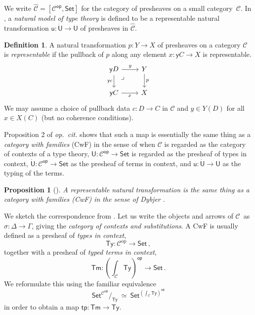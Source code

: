 \documentclass[12pt,reqno]{amsart}
\newcommand{\C}{\ensuremath{\mathbb{C}}}
\newcommand{\CC}{\ensuremath{\mathcal{C}}}
\newcommand{\op}[1]{\ensuremath{{#1}^{\mathsf{op}}}}
\newcommand{\pshx}[1]{\ensuremath{\mathsf{Set}^{\op{#1}}}}
\newcommand{\psh}[1]{\ensuremath{[\op{#1},\mathsf{Set}]}}
\newcommand{\Set}{\ensuremath{\mathsf{Set}}}
\newcommand{\y}{\ensuremath{\mathsf{y}}} %
\newcommand{\tp}{\ensuremath{\mathsf{tp}}}
\newcommand{\Tm}{\ensuremath{\mathsf{Tm}}}
\newcommand{\Ty}{\ensuremath{\mathsf{Ty}}}
\renewcommand{\to}{\ensuremath{\rightarrow}}
\renewcommand{\t}{\ensuremath{\mathsf{u}}}
\newcommand{\T}{\ensuremath{\mathsf{U}}}
\newcommand{\TT}{\ensuremath{\dot{\mathsf{U}}}}
\newcommand{\pbcorner}{\arrow[dr,phantom,"\lrcorner" very near start, shift right=.5ex]} %
\newtheorem{proposition}[theorem]{Proposition}
\theoremstyle{remark}
\theoremstyle{definition}
\newtheorem{definition}[theorem]{Definition}
\begin{document}
\noindent We write $\widehat{\CC} = \psh{\CC}$ for the category of presheaves on a small category~$\CC$. 
In \cite{awodey:NM}, a \emph{natural model of type theory} is defined to be a representable natural transformation $\t: \TT\to \T$ of presheaves in $\widehat{\CC}$.  

\begin{definition}\label{def:representablenattrans} A natural transformation $p : Y \to X$ of presheaves on a category $\CC$  is \emph{representable} if the pullback of $p$ along any element $x: \y{C} \to X$ is representable.
\begin{equation*}
\begin{tikzcd}
 \y{D} \ar[d,swap,"{\y{c}}"] \ar[r,"y"] \pbcorner &  Y \ar[d, "p"]\\
\y{C} \ar[r,swap,"x"]  & X
\end{tikzcd}
\end{equation*}
We may assume a choice of pullback data $c : D \to C$ in $\CC$ and $y \in Y(D)$ for all $x\in X(C)$ (but no coherence conditions).
\end{definition}

Proposition 2 of \emph{op.\ cit.} shows that such a map is essentially the same thing as a \emph{category with families} (CwF) in the sense of \cite{Dybjer:CWF} when $\CC$ is regarded as the category of contexts of a type theory, $\T: \op{\CC} \to \Set$ is regarded as the presheaf of types in context, $\TT: \op{\CC} \to \Set$ as the presheaf of terms in context, and $\t : \TT\to\T$ as the typing of the terms.   

\begin{proposition}[\cite{awodey:NM, Fiore:2012}] A representable natural transformation is the same thing as a \emph{category with families (CwF)} in the sense of Dybjer \cite{Dybjer:CWF}.
\end{proposition}

We sketch the correspondence from \cite{awodey:NM}.
Let us write the objects and arrows of \CC\ as $\sigma : \Delta \to \Gamma$, giving the \emph{category of contexts and substitutions}.
A CwF is usually defined as a presheaf of \emph{types in context}, 
\[
\Ty : \CC^{\mathrm{op}}\to \Set\,,
\]
together with a presheaf of \emph{typed terms in context}, 
\[
\Tm : {\textstyle (\int_{\CC}\!\Ty)^{\mathsf{op}}\to \Set }\,.
\]
We reformulate this using the familiar equivalence
\[\textstyle
 \pshx{\CC}\!/_{\Ty}\ \simeq\ \pshx{(\int_{\CC}\Ty)}
\]
in order to obtain a map $\tp :\Tm \to \Ty$.
\end{document}
